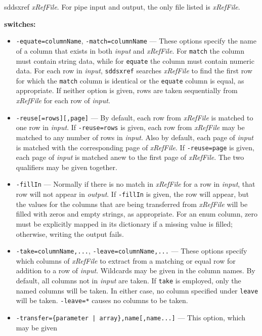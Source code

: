 \begin{sddsprog}{sddsxref}
    \emph{xRefFile}. For pipe input and output, the only file listed is \emph{xRefFile}.
  \item \textbf{switches:}
    \begin{itemize}
      \item \verb|-equate=columnName|, \verb|-match=columnName| --- These options specify the name of a column
        that exists in both \emph{input} and \emph{xRefFile}. For \verb|match| the column must contain
        string data, while for \verb|equate| the column must contain numeric data. For each row in
        \emph{input}, \verb|sddsxref| searches \emph{xRefFile} to find the first row for which the
        \verb|match| column is identical or the \verb|equate| column is equal, as appropriate. If neither
        option is given, rows are taken sequentially from \emph{xRefFile} for each row of \emph{input}.
      \item \verb|-reuse[=rows][,page]| --- By default, each row from \emph{xRefFile} is matched to one row in
        \emph{input}. If \verb|-reuse=rows| is given, each row from \emph{xRefFile} may be matched to any
        number of rows in \emph{input}. Also by default, each page of \emph{input} is matched with the
        corresponding page of \emph{xRefFile}. If \verb|-reuse=page| is given, each page of \emph{input}
        is matched anew to the first page of \emph{xRefFile}. The two qualifiers may be given together.
      \item \verb|-fillIn| --- Normally if there is no match in \emph{xRefFile} for a row in \emph{input},
        that row will not appear in \emph{output}. If \verb|-fillIn| is given, the row will appear, but the
        values for the columns that are being transferred from \emph{xRefFile} will be filled with zeros
        and empty strings, as appropriate. For an enum column, zero must be explicitly mapped in its
        dictionary if a missing value is filled; otherwise, writing the output fails.
      \item \verb|-take=columnName,...|, \verb|-leave=columnName,...| --- These options specify which columns
        of \emph{xRefFile} to extract from a matching or equal row for addition to a row of \emph{input}.
        Wildcards may be given in the column names. By default, all columns not in \emph{input} are taken.
        If \verb|take| is employed, only the named columns will be taken. In either case, no column
        specified under \verb|leave| will be taken. \verb|-leave=*| causes no columns to be taken.
      \item \verb!-transfer={parameter | array},name[,name...]! --- This option, which may be given

\end{itemize}
\end{sddsprog}
